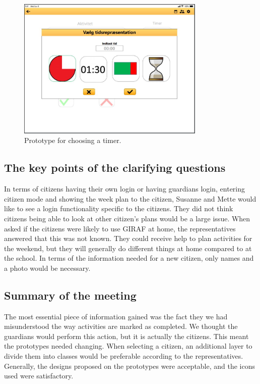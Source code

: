 \begin{figure}[h!]
  \center
  \includegraphics[width=0.8\textwidth]{figures/select-timer-prototype.JPG}
  \caption{\label{fig:choose-timer-prototype} Prototype for choosing a timer.}
\end{figure}

\subsection{The key points of the clarifying questions}
In terms of citizens having their own login or having guardians login, entering citizen mode and showing the week plan to the citizen, Susanne and Mette would like to see a login functionality specific to the citizens.
They did not think citizens being able to look at other citizen's plans would be a large issue.
When asked if the citizens were likely to use GIRAF at home, the representatives answered that this was not known.
They could receive help to plan activities for the weekend, but they will generally do different things at home compared to at the school.
In terms of the information needed for a new citizen, only names and a photo would be necessary.

\subsection{Summary of the meeting}
The most essential piece of information gained was the fact they we had misunderstood the way activities are marked as completed.
We thought the guardians would perform this action, but it is actually the citizens.
This meant the prototypes needed changing.
When selecting a citizen, an additional layer to divide them into classes would be preferable according to the representatives.
Generally, the designs proposed on the prototypes were acceptable, and the icons used were satisfactory.
